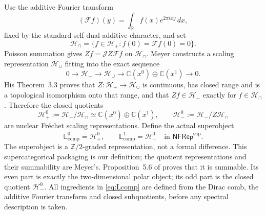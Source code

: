 \documentclass[11pt]{amsart}
\theoremstyle{definition}
\theoremstyle{remark}
\newcommand{\C}{\mathbb C}
\newcommand{\R}{\mathbb R}
\newcommand{\Z}{\mathbb Z}
\begin{document}
Use the additive Fourier transform
\begin{equation}\label{eq:additiveFourier}
 (\mathcal Ff)(y)=\int_\R f(x)e^{2\pi ixy}\,dx,
\end{equation}
fixed by the standard self-dual additive character, and set
\begin{equation}\label{eq:Hcap}
 \mathcal H_\cap=
 \{f\in\mathcal H_+:f(0)=\mathcal Ff(0)=0\}.
\end{equation}
Poisson summation gives $Zf=\mathscr JZ\mathcal Ff$ on
$\mathcal H_\cap$.  Meyer constructs a scaling representation
$\mathcal H_\cup$ fitting into the exact sequence
\begin{equation}\label{eq:poleextension}
 0\longrightarrow\mathcal H_-
 \longrightarrow\mathcal H_\cup
 \longrightarrow\C(x^0)\oplus\C(x^1)\longrightarrow0.
\end{equation}
His Theorem~3.3 proves that
$Z:\mathcal H_+\to\mathcal H_\cup$ is continuous, has closed range and is
a topological isomorphism onto that range, and that
$Zf\in\mathcal H_-$ exactly for $f\in\mathcal H_\cap$.  Therefore the
closed quotients
\begin{equation}\label{eq:Poissonquotients}
 \mathcal H_+^0:=\mathcal H_+/\mathcal H_\cap
 \simeq\C(x^0)\oplus\C(x^1),
 \qquad
 \mathcal H_-^0:=\mathcal H_-/Z\mathcal H_\cap
\end{equation}
are nuclear Fr\'echet scaling representations.  Define the actual
superobject
\begin{equation}\label{eq:Lcomp}
 \mathbb L_{\mathrm{comp}}^{\bar0}=\mathcal H_+^0,\qquad
 \mathbb L_{\mathrm{comp}}^{\bar1}=\mathcal H_-^0
 \quad\text{in }\mathsf{NFRep}^{\mathrm{sup}}.
\end{equation}
The superobject is a $\Z/2$-graded representation, not a formal
difference.  This supercategorical packaging is our
definition; the quotient representations and their summability are
Meyer's.  Proposition~5.6 of
\cite{MeyerZeta} proves that it is summable.  Its even part is exactly the
two-dimensional polar object; its odd part is the closed quotient
$\mathcal H_-^0$.
All ingredients in \eqref{eq:Lcomp} are defined from the Dirac comb, the
additive Fourier transform and closed subquotients, before any spectral
description is taken.
\end{document}
